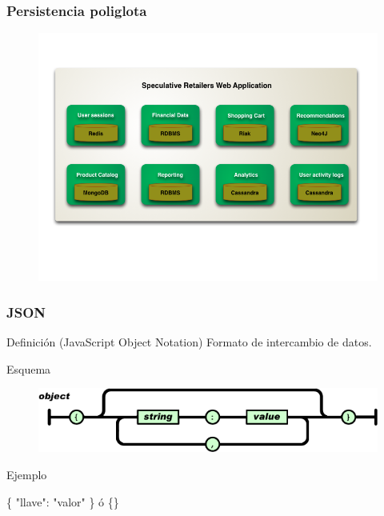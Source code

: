 \documentclass{beamer}
\begin{document}

\begin{frame}
\frametitle{Persistencia poliglota}
\begin{figure}
\includegraphics[width=1.0\linewidth]{polyglot.png}
\end{figure}
\end{frame}


\begin{frame}
\frametitle{JSON}
\begin{block}{Definici\'on}
 (JavaScript Object Notation) Formato de intercambio de datos.
\end{block}

\begin{block}{Esquema}
\begin{figure}
\includegraphics[width=0.7\linewidth]{object.png}
\end{figure}
\end{block}

\begin{block}{Ejemplo}
\begin{center}
\{ "llave": "valor" \} \'o \{\}
\end{center}
\end{block}
\end{frame}
\end{document}
